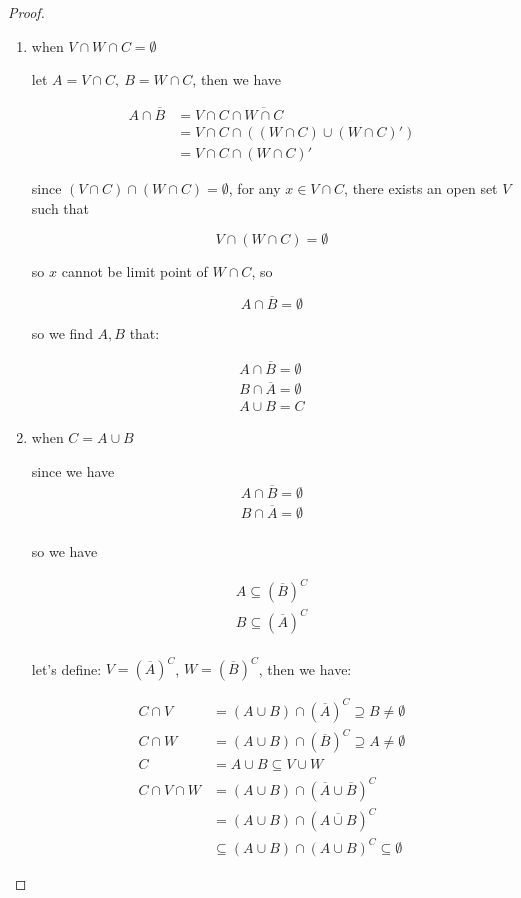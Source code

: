 \begin{proof}
   \begin{enumerate}
    \item when $V \cap W \cap C = \emptyset$

    let $A = V \cap C,\: B = W \cap C$, then we have

    \begin{align*}
        A \cap \overline{B} &= V \cap C \cap \overline{W \cap C} \\
        & = V \cap C \cap ((W \cap C) \cup (W \cap C)') \\
        &= V \cap C \cap (W \cap C)'
    \end{align*}


    since $(V \cap C) \cap (W \cap C) = \emptyset$, for any $x \in V \cap C$, there exists an open set $V$ such that

    \[
        V \cap (W \cap C) = \emptyset
    \]

    so $x$ cannot be limit point of $W \cap C$, so

    \[
        A \cap \overline{B} = \emptyset
    \]

    so we find $A, B$ that:

    \begin{align*}
        A \cap \overline{B} = \emptyset \\
        B \cap \overline{A} = \emptyset \\
        A \cup B = C
    \end{align*}


    \item when $C = A \cup B$

    since we have 
    \begin{align*}
       A \cap \overline{B} = \emptyset \\ 
        B \cap \overline{A} = \emptyset \\
    \end{align*}

    so we have


    \begin{align*}
       A \subseteq (\overline{B})^C \\
       B \subseteq (\overline{A})^C \\
    \end{align*}

    let's define: $V = (\overline{A})^C$, $W = (\overline{B})^C$, then we have:

    \begin{align*}
        C \cap V &= (A \cup B) \cap (\overline{A})^C \supseteq B \ne \emptyset \\
        C \cap W &= (A \cup B) \cap (\overline{B})^C \supseteq A \ne \emptyset \\
        C &= A \cup B \subseteq V \cup W \\
        C \cap V \cap W & = (A \cup B) \cap (\overline{A} \cup \overline{B})^C \\
        & = (A \cup B) \cap (\overline{A \cup B})^C \\
        & \subseteq (A \cup B) \cap (A \cup B)^C \subseteq \emptyset
    \end{align*}
    


\end{enumerate}
\end{proof}
